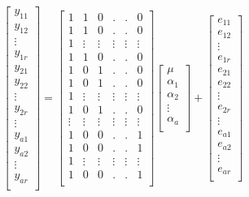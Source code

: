 \documentclass[
]{book}
\theoremstyle{definition}
\theoremstyle{definition}
\theoremstyle{definition}
\theoremstyle{definition}
\theoremstyle{remark}
\begin{document}
\begin{equation}
\begin{bmatrix}
y_{11} \\
y_{12} \\
\vdots \\
y_{1r} \\
y_{21} \\
y_{22} \\
\vdots \\
y_{2r} \\
\vdots \\
y_{a1} \\
y_{a2} \\
\vdots \\
y_{ar} \\
\end{bmatrix} 
 =
\begin{bmatrix}
1 & 1 & 0 & . & . & 0 \\
1 & 1 & 0 & . & . & 0 \\
1 & \vdots & \vdots & \vdots & \vdots & \vdots \\
1 & 1 & 0 & . & . & 0 \\
1 & 0 & 1 & . & . & 0 \\
1 & 0 & 1 & . & . & 0 \\
1 & \vdots & \vdots & \vdots & \vdots & \vdots \\
1 & 0 & 1 & . & . & 0 \\
\vdots & \vdots & \vdots & \vdots & \vdots & \vdots \\
1 & 0 & 0 & . & . & 1 \\
1 & 0 & 0 & . & . & 1 \\
1 & \vdots & \vdots & \vdots & \vdots & \vdots \\
1 & 0 & 0 & . & . & 1 \\
\end{bmatrix}
\begin{bmatrix}
\mu \\
\alpha_{1} \\
\alpha_{2} \\
\vdots \\
\alpha_{a} \\
\end{bmatrix} +
\begin{bmatrix}
e_{11} \\
e_{12} \\
\vdots \\
e_{1r} \\
e_{21} \\
e_{22} \\
\vdots \\
e_{2r} \\
\vdots \\
e_{a1} \\
e_{a2} \\
\vdots \\
e_{ar} \\
\end{bmatrix}
\label{eq:lm2}
\end{equation}
\end{document}
